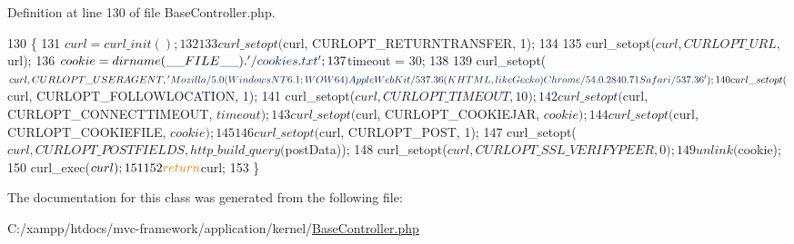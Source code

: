 Definition at line 130 of file Base\+Controller.\+php.


\begin{DoxyCode}
130                                                 \{
131         $curl = curl\_init();
132 
133         curl\_setopt($curl, CURLOPT\_RETURNTRANSFER, 1); 
134 
135         curl\_setopt($curl, CURLOPT\_URL, $url);
136         $cookie = dirname(\_\_FILE\_\_) . \textcolor{stringliteral}{'/cookies.txt'};
137         $timeout = 30;
138 
139         curl\_setopt($curl, CURLOPT\_USERAGENT, \textcolor{stringliteral}{'Mozilla/5.0 (Windows NT 6.1; WOW64) AppleWebKit/537.36
       (KHTML, like Gecko) Chrome/54.0.2840.71 Safari/537.36'});
140         curl\_setopt($curl, CURLOPT\_FOLLOWLOCATION, 1);
141         curl\_setopt($curl, CURLOPT\_TIMEOUT, 10); 
142         curl\_setopt($curl, CURLOPT\_CONNECTTIMEOUT, $timeout);
143         curl\_setopt($curl, CURLOPT\_COOKIEJAR, $cookie);
144         curl\_setopt($curl, CURLOPT\_COOKIEFILE, $cookie);
145 
146         curl\_setopt($curl, CURLOPT\_POST, 1); 
147         curl\_setopt($curl, CURLOPT\_POSTFIELDS, http\_build\_query($postData));     
148         curl\_setopt($curl, CURLOPT\_SSL\_VERIFYPEER, 0);
149         unlink($cookie);
150         curl\_exec($curl);
151 
152         \textcolor{keywordflow}{return} $curl;
153     \}
\end{DoxyCode}


The documentation for this class was generated from the following file\+:\begin{DoxyCompactItemize}
\item 
C\+:/xampp/htdocs/mvc-\/framework/application/kernel/\hyperlink{_base_controller_8php}{Base\+Controller.\+php}\end{DoxyCompactItemize}
